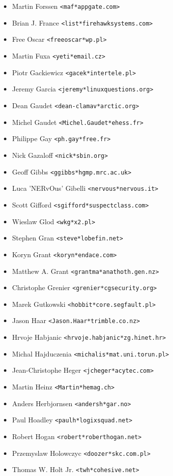 \documentclass[a4paper,titlepage,12pt]{article}
\newcommand{\email}[1]{\texttt{#1}}
\begin{document}
\begin{itemize}
	\item Martin Forssen \email{<maf*appgate.com>}
	\item Brian J. France \email{<list*firehawksystems.com>}
	\item Free Oscar \email{<freeoscar*wp.pl>}
	\item Martin Fuxa \email{<yeti*email.cz>}
	\item Piotr Gackiewicz \email{<gacek*intertele.pl>}
	\item Jeremy Garcia \email{<jeremy*linuxquestions.org>}
	\item Dean Gaudet \email{<dean-clamav*arctic.org>}
	\item Michel Gaudet \email{<Michel.Gaudet*ehess.fr>}
	\item Philippe Gay \email{<ph.gay*free.fr>}
	\item Nick Gazaloff \email{<nick*sbin.org>}
	\item Geoff Gibbs \email{<ggibbs*hgmp.mrc.ac.uk>}
	\item Luca 'NERvOus' Gibelli \email{<nervous*nervous.it>}
	\item Scott Gifford \email{<sgifford*suspectclass.com>}
	\item Wieslaw Glod \email{<wkg*x2.pl>}
	\item Stephen Gran \email{<steve*lobefin.net>}
	\item Koryn Grant \email{<koryn*endace.com>}
	\item Matthew A. Grant \email{<grantma*anathoth.gen.nz>}
	\item Christophe Grenier \email{<grenier*cgsecurity.org>}
	\item Marek Gutkowski \email{<hobbit*core.segfault.pl>}
	\item Jason Haar \email{<Jason.Haar*trimble.co.nz>}
	\item Hrvoje Habjanic \email{<hrvoje.habjanic*zg.hinet.hr>}
	\item Michal Hajduczenia \email{<michalis*mat.uni.torun.pl>}
	\item Jean-Christophe Heger \email{<jcheger*acytec.com>}
	\item Martin Heinz \email{<Martin*hemag.ch>}
	\item Anders Herbjornsen \email{<andersh*gar.no>}
	\item Paul Hoadley \email{<paulh*logixsquad.net>}
	\item Robert Hogan \email{<robert*roberthogan.net>}
	\item Przemyslaw Holowczyc \email{<doozer*skc.com.pl>}
	\item Thomas W. Holt Jr. \email{<twh*cohesive.net>}

\end{itemize}
\end{document}
